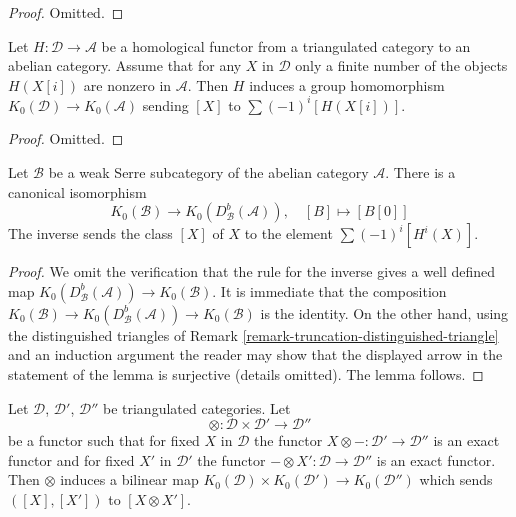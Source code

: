 \begin{proof}
Omitted.
\end{proof}

\begin{lemma}
\label{lemma-homological-map-K}
Let $H : \mathcal{D} \to \mathcal{A}$ be a homological functor
from a triangulated category to an abelian category. Assume that
for any $X$ in $\mathcal{D}$ only a finite number of the objects
$H(X[i])$ are nonzero in $\mathcal{A}$. Then $H$ induces a group homomorphism
$K_0(\mathcal{D}) \to K_0(\mathcal{A})$ sending $[X]$ to
$\sum (-1)^i[H(X[i])]$.
\end{lemma}

\begin{proof}
Omitted.
\end{proof}

\begin{lemma}
\label{lemma-DBA-map-K}
Let $\mathcal{B}$ be a weak Serre subcategory of the abelian category
$\mathcal{A}$. There is a canonical isomorphism
$$
K_0(\mathcal{B}) \longrightarrow
K_0(D^b_\mathcal{B}(\mathcal{A})),\quad
[B] \longmapsto [B[0]]
$$
The inverse sends the class $[X]$ of $X$
to the element $\sum (-1)^i[H^i(X)]$.
\end{lemma}

\begin{proof}
We omit the verification that the rule for the inverse gives a well defined
map $K_0(D^b_\mathcal{B}(\mathcal{A})) \to K_0(\mathcal{B})$.
It is immediate that the composition
$K_0(\mathcal{B}) \to
K_0(D^b_\mathcal{B}(\mathcal{A})) \to
K_0(\mathcal{B})$ is the identity. On the other hand, using the
distinguished triangles of
Remark \ref{remark-truncation-distinguished-triangle} and an
induction argument the reader may show that the displayed arrow
in the statement of the lemma is surjective (details omitted).
The lemma follows.
\end{proof}

\begin{lemma}
\label{lemma-bilinear-map-K}
Let $\mathcal{D}$, $\mathcal{D}'$, $\mathcal{D}''$ be triangulated categories.
Let
$$
\otimes : \mathcal{D} \times \mathcal{D}' \longrightarrow \mathcal{D}''
$$
be a functor such that for fixed $X$ in $\mathcal{D}$ the functor
$X \otimes - : \mathcal{D}' \to \mathcal{D}''$ is an exact functor and
for fixed $X'$ in $\mathcal{D}'$ the functor
$- \otimes X' : \mathcal{D} \to \mathcal{D}''$ is an exact functor. Then
$\otimes$ induces a bilinear map
$K_0(\mathcal{D}) \times K_0(\mathcal{D}') \to K_0(\mathcal{D}'')$
which sends $([X], [X'])$ to $[X \otimes X']$.
\end{lemma}

